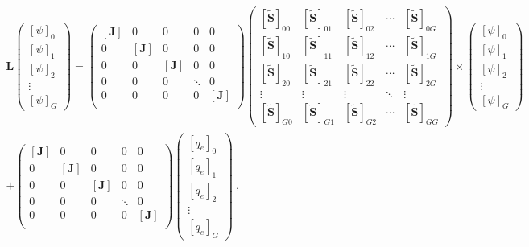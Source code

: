 \documentclass[12pt,twoside]{article}
\newcommand{\ve}[1]{\ensuremath{\mathbf{#1}}}
\begin{document}
\begin{multline}
    \ve{L}
    \begin{pmatrix}
      [\psi]_0 \\
      [\psi]_1 \\
      [\psi]_2 \\
      \vdots   \\
      [\psi]_G
    \end{pmatrix} =
    \begin{pmatrix}
      [\ve{J}] & 0 & 0 & 0 & 0 \\
      0 & [\ve{J}] & 0 & 0 & 0 \\
      0 & 0 & [\ve{J}] & 0 & 0 \\
      0 & 0 & 0 & \ddots & 0 \\
      0 & 0 & 0 & 0 & [\ve{J}] \\
    \end{pmatrix}
    \begin{pmatrix}
      [\ve{\tilde{S}}]_{00} & [\ve{\tilde{S}}]_{01} & [\ve{\tilde{S}}]_{02} & \cdots &
      [\ve{\tilde{S}}]_{0G} \\
      [\ve{\tilde{S}}]_{10} & [\ve{\tilde{S}}]_{11} & [\ve{\tilde{S}}]_{12} & \cdots &
      [\ve{\tilde{S}}]_{1G} \\
      [\ve{\tilde{S}}]_{20} & [\ve{\tilde{S}}]_{21} & [\ve{\tilde{S}}]_{22} & \cdots &
      [\ve{\tilde{S}}]_{2G} \\
      \vdots & \vdots & \vdots & \ddots & \vdots \\
      [\ve{\tilde{S}}]_{G0} & [\ve{\tilde{S}}]_{G1} & [\ve{\tilde{S}}]_{G2} & \cdots &
      [\ve{\tilde{S}}]_{GG}
    \end{pmatrix}
    \times
    \begin{pmatrix}
      [\psi]_0 \\
      [\psi]_1 \\
      [\psi]_2 \\
      \vdots   \\
      [\psi]_G
    \end{pmatrix}\\
    +
    \begin{pmatrix}
      [\ve{J}] & 0 & 0 & 0 & 0 \\
      0 & [\ve{J}] & 0 & 0 & 0 \\
      0 & 0 & [\ve{J}] & 0 & 0 \\
      0 & 0 & 0 & \ddots & 0 \\
      0 & 0 & 0 & 0 & [\ve{J}] \\
    \end{pmatrix}
    \begin{pmatrix}
      [q_e]_0 \\
      [q_e]_1 \\
      [q_e]_2 \\
      \vdots   \\
      [q_e]_G
    \end{pmatrix}\:,
    \label{eq:matrix-transport}
\end{multline}
\end{document}
